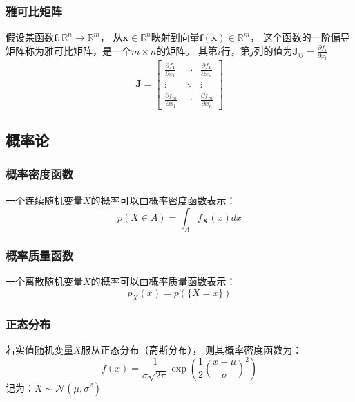 \subsubsection{雅可比矩阵}

假设某函数{$\bm{f}:\mathbb{R}^{n}\rightarrow\mathbb{R}^{m}$}，
从{$\bm{x}\in\mathbb{R}^{n}$}映射到向量{$\bm{f(x)}\in\mathbb{R}^{m}$}，
这个函数的一阶偏导矩阵称为雅可比矩阵，是一个{$m\times n$}的矩阵。
其第{$i$}行，第{$j$}列的值为{$\bm{J}_{ij}=\frac{\partial f_i}{\partial x_i} $}
\begin{equation}
    \label{eq:jacabian_matrix}
    \bm{J}=
    \begin{bmatrix}
        \frac{\partial f_1}{\partial x_1}& \cdots & \frac{\partial f_1}{\partial x_n}\\
        \vdots &\ddots  & \vdots \\
        \frac{\partial f_m}{\partial x_1}& \cdots & \frac{\partial f_m}{\partial x_n}
    \end{bmatrix}
\end{equation}









\subsection{概率论}
\subsubsection{概率密度函数}
一个连续随机变量{$X$}的概率可以由概率密度函数表示：
\begin{equation}
    p(X\in A )= \int_A f_{\bm{X}}(x)dx
\end{equation}
\subsubsection{概率质量函数}
一个离散随机变量{$X$}的概率可以由概率质量函数表示：
\begin{equation}
    p_{X}(x)=p(\{X=x\})
\end{equation}
\subsubsection{正态分布}
若实值随机变量{$X$}服从正态分布（高斯分布），
则其概率密度函数为：
\begin{equation}
    \label{eq:gaussian_distribution}
    f(x)=\frac{1}{\sigma\sqrt{2\pi}}\exp({\frac{1}{2}{(\frac{x-\mu}{\sigma})}^{2}})
\end{equation}
记为：{$X\sim \mathcal{N}(\mu,\sigma^{2})$}

